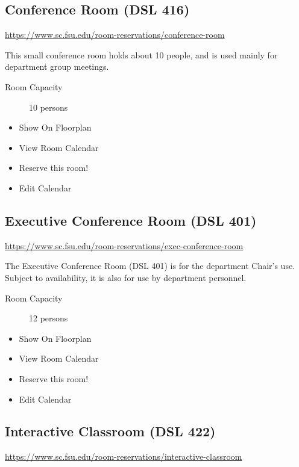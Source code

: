\documentclass[12pt,a4paper]{article}
\begin{document}
\subsection{Conference Room (DSL 416)}
\url{https://www.sc.fsu.edu/room-reservations/conference-room}

This small conference room holds about 10 people, and is used mainly for department group meetings.
\begin{description}
    \item[Room Capacity] 10 persons
\end{description}
\begin{itemize}
    \item Show On Floorplan
    \item View Room Calendar
    \item Reserve this room!
    \item Edit Calendar
\end{itemize}

\subsection{Executive Conference Room (DSL 401)}
\url{https://www.sc.fsu.edu/room-reservations/exec-conference-room}

The Executive Conference Room (DSL 401) is for the department Chair's use. Subject to availability, it is also for use by department personnel.
\begin{description}
    \item[Room Capacity] 12 persons
\end{description}
\begin{itemize}
    \item Show On Floorplan
    \item View Room Calendar
    \item Reserve this room!
    \item Edit Calendar
\end{itemize}

\subsection{Interactive Classroom (DSL 422)}
\url{https://www.sc.fsu.edu/room-reservations/interactive-classroom}
\end{document}
